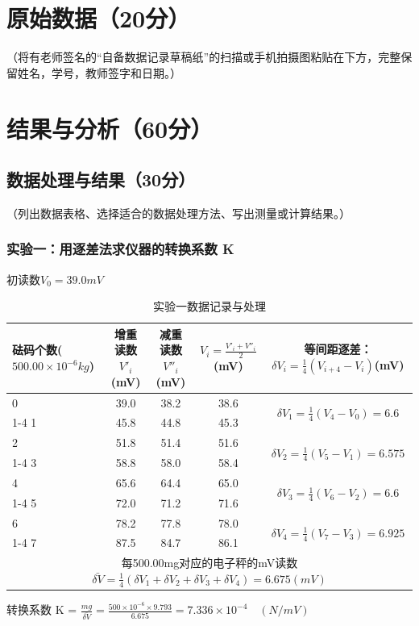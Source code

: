 \documentclass[]{../../templates/Report}%
\begin{document}
\begin{fullreportonly}
\section{原始数据（20分）}
（将有老师签名的“自备数据记录草稿纸”的扫描或手机拍摄图粘贴在下方，完整保留姓名，学号，教师签字和日期。）

\section{结果与分析（60分）}
\subsection{数据处理与结果（30分）}
（列出数据表格、选择适合的数据处理方法、写出测量或计算结果。）
\subsubsection{实验一：用逐差法求仪器的转换系数 K}
初读数$V_0 = 39.0mV$
\begin{table}[H]
    \centering
    \caption{实验一数据记录与处理}
    \begin{tabular}{|p{6em}|c|c|c|c|}
        \hline
        \textbf{砝码个数($500.00 \times 10^{-6}kg$)} & \textbf{增重读数$V'_i$(mV)} & \textbf{减重读数$V''_i$(mV)} & $V_i = \frac{V'_i + V''_i}{2}$(mV) & \textbf{等间距逐差：$\delta V_i = \frac{1}{4}(V_{i+4} - V_i)$(mV)}  \\
        \hline
        0 & 39.0 & 38.2 & 38.6 & \multirow{2}{*}{$\delta V_1=\frac{1}{4}(V_4-V_0) = 6.6$} \\
        \cline{1-4}
        1 & 45.8 & 44.8 & 45.3 &  \\
        \hline
        2 & 51.8 & 51.4 & 51.6 & \multirow{2}{*}{$\delta V_2=\frac{1}{4}(V_5-V_1) = 6.575$} \\
        \cline{1-4}
        3 & 58.8 & 58.0 & 58.4 &  \\
        \hline
        4 & 65.6 & 64.4 & 65.0 & \multirow{2}{*}{$\delta V_3=\frac{1}{4}(V_6-V_2) = 6.6$} \\
        \cline{1-4}
        5 & 72.0 & 71.2 & 71.6 &  \\
        \hline
        6 & 78.2 & 77.8 & 78.0 & \multirow{2}{*}{$\delta V_4=\frac{1}{4}(V_7-V_3) = 6.925$} \\
        \cline{1-4}
        7 & 87.5 & 84.7 & 86.1 &  \\
        \hline
        \multicolumn{5}{|c|}{每500.00mg对应的电子秤的mV读数$\bar{\delta V} = \frac{1}{4}(\delta V_1 + \delta V_2 + \delta V_3 + \delta V_4) = 6.675(mV)$}  \\
        \hline
    \end{tabular}
\end{table}
转换系数 K = $\frac{mg}{\bar{\delta V}} = \frac{500 \times 10^{-6} \times 9.793}{6.675} = 7.336 \times 10^{-4} \quad (N/mV)$


\end{fullreportonly}
\end{document}
